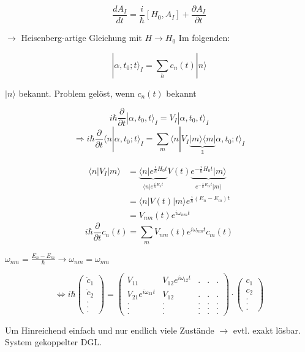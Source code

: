 \[\frac{dA_I}{dt} = \frac{i}{\hbar}[H_0,A_I]+ \frac{\partial A_I}{\partial t}\]

\(\rightarrow\) Heisenberg-artige Gleichung mit \(H\rightarrow H_0\) Im folgenden:

\[ |\alpha,t_0;t\rangle_I = \sum_h c_n(t)|n\rangle\]

\(|n\rangle\) bekannt. Problem gelöst, wenn \(c_n(t)\) bekannt

\[ i\hbar \frac{\partial}{\partial t}|\alpha,t_0,t\rangle_I = V_I|\alpha,t_0,t\rangle_I\]
\[\Rightarrow i\hbar\frac{\partial}{\partial t}\langle n|\alpha,t_0;t\rangle_I = \sum_m \langle n|V_I\underbrace{|m\rangle\langle m|}_{\mathbb 1}\alpha,t_0;t\rangle_I\]

\begin{align}
\langle n|V_I|m\rangle &= \underbrace{\langle n | e^{\frac{i}{\hbar}H_0t}}_{\langle n|e^{\frac{i}{\hbar}E_nt}}V(t)\underbrace{e^{-\frac{i}{\hbar}H_0t}|m\rangle}_{e^{-\frac{i}{\hbar}E_mt}|m\rangle } \\
& = \langle n|V(t)|m\rangle e^{\frac{i}{\hbar}(E_n-E_m)t} \\
&= V_{nm}(t) e^{i\omega_{nm} t}
\end{align}
\[\boxed{i\hbar \frac{\partial}{\partial t}c_n(t) = \sum_m V_{nm}(t) e^{i\omega_{nm}t}c_m(t)}\]

\(\omega_{nm}=\frac{E_n-E_m}{\hbar}\rightarrow \omega_{nm}=\omega_{mn}\)

\[\Leftrightarrow i\hbar \begin{pmatrix}\dot c_1\\\dot c_2\\.\\.\\.\end{pmatrix} =\begin{pmatrix}V_{11}&V_{12}e^{i\omega_{12}t}&.&.&.\\
  V_{21}e^{i\omega_{21}t}&V_{12}&.&.&.\\
  .&.&.&.&.\\
  .&.&.&.&.\\
  .&.&.&.&.
\end{pmatrix}\cdot\begin{pmatrix}c_1\\c_2\\.\\.\\.\end{pmatrix}\]

Um Hinreichend einfach und nur endlich viele Zustände \(\rightarrow\) evtl. exakt lösbar. System gekoppelter DGL.


